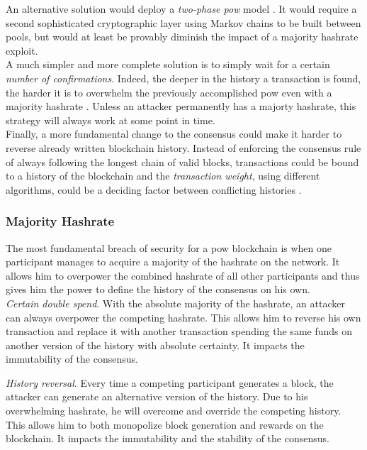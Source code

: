 \documentclass[12pt,a4paper]{article}
\begin{document}
An alternative solution would deploy a \textit{two-phase \acrshort{pow}} model \cite{twophase}. It would require a second sophisticated cryptographic layer using Markov chains to be built between \glspl{pool}, but would at least be provably diminish the impact of a majority \gls{hashrate} exploit.\\

A much simpler and more complete solution is to simply wait for a certain \textit{number of confirmations}. Indeed, the deeper in the history a transaction is found, the harder it is to overwhelm the previously accomplished \acrshort{pow} even with a majority \gls{hashrate} \cite{double}. Unless an attacker permanently has a majorty hashrate, this strategy will always work at some point in time.\\

Finally, a more fundamental change to the \gls{consensus} could make it harder to reverse already written blockchain history. Instead of enforcing the consensus rule of always following the longest chain of valid blocks, transactions could be bound to a history of the blockchain and the \textit{transaction weight}, using different algorithms, could be a deciding factor between conflicting histories \cite{weight}.\\

\subsubsection{Majority Hashrate}

The most fundamental breach of security for a \acrshort{pow} \gls{blockchain} is when one participant manages to acquire a majority of the \gls{hashrate} on the network. It allows him to overpower the combined \gls{hashrate} of all other participants and thus gives him the power to define the history of the \gls{consensus} on his own.\\

\textit{Certain double spend}. With the absolute majority of the \gls{hashrate}, an attacker can always overpower the competing \gls{hashrate}. This allows him to reverse his own transaction and replace it with another transaction spending the same funds on another version of the history with absolute certainty. It impacts the immutability of the \gls{consensus}.

\textit{History reversal}. Every time a competing participant generates a block, the attacker can generate an alternative version of the history. Due to his overwhelming \gls{hashrate}, he will overcome and override the competing history. This allows him to both monopolize block generation and rewards on the \gls{blockchain}. It impacts the immutability and the stability of the \gls{consensus}.
\end{document}
